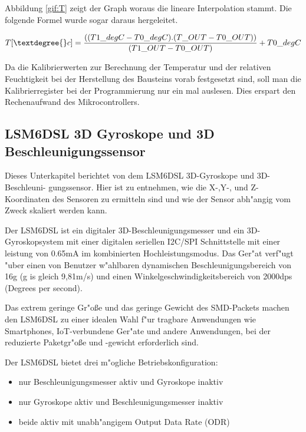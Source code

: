 \vspace{3cm}

Abbildung \ref{gif:T} zeigt der Graph woraus die lineare Interpolation stammt. Die folgende Formel wurde sogar daraus hergeleitet.

\begin{center}
	\[
	T[\textdegree{}c] = \frac{((T1\_degC - T0\_degC) . (T\_OUT - T0\_OUT))}{(T1\_OUT - T0\_OUT) } + T0\_degC  
	\]\label{TempFormel}
\end{center}

 Da die Kalibrierwerten zur Berechnung der Temperatur und der relativen Feuchtigkeit bei der Herstellung des Bausteins vorab festgesetzt sind, soll man die Kalibrierregister bei der Programmierung nur ein mal auslesen. Dies erspart den Rechenaufwand des Mikrocontrollers.
 
\subsection{LSM6DSL 3D Gyroskope und 3D Beschleunigungssensor}\label{Acc/Gy}

Dieses Unterkapitel berichtet von dem LSM6DSL 3D-Gyroskope und 3D-Beschleuni- gungssensor. Hier ist zu entnehmen, wie die X-,Y-, und Z-Koordinaten des Sensoren zu ermitteln sind und wie der Sensor abh"angig vom Zweck skaliert werden kann.
 

Der LSM6DSL ist ein digitaler 3D-Beschleunigungsmesser und ein 3D-Gyroskopsystem mit einer digitalen seriellen I2C/SPI Schnittstelle mit einer leistung von 0.65mA im kombinierten Hochleistungsmodus.
Das Ger"at verf"ugt "uber einen von Benutzer w"ahlbaren dynamischen Beschleunigungsbereich von  \textbar {} \textbar {} \textbar \textpm 16g (g is gleich 9,81m/s) und einen Winkelgeschwindigkeitsbereich von  \textbar {} \textbar {} \textbar {} \textbar \textpm 2000dps (Degrees per second).
 
Das extrem geringe Gr"o\ss{}e und das geringe Gewicht des SMD-Packets machen den LSM6DSL zu einer idealen Wahl f"ur tragbare Anwendungen wie Smartphones, IoT-verbundene Ger"ate und andere Anwendungen, bei der reduzierte Paketgr"o\ss{}e und -gewicht erforderlich sind.  

Der LSM6DSL bietet drei m"ogliche Betriebskonfiguration:
\begin{itemize}
	\item nur Beschleunigungsmesser aktiv und Gyroskope inaktiv
	\item nur Gyroskope aktiv und Beschleunigungsmesser inaktiv
	\item beide aktiv mit unabh"angigem Output Data Rate (ODR) 
\end{itemize}

